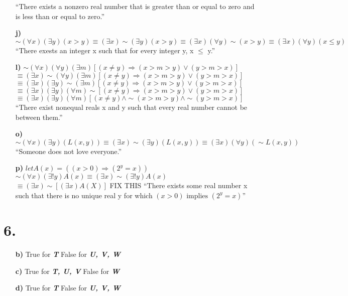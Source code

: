 \documentclass[12pt,letterpaper]{article}
\begin{document}
\begin{enumerate}[label= \textbf{\alph*)}]
						``There exists a nonzero real number that is greater than or equal to zero and is less than or equal to zero.''
	\item[\textbf{j)}] $\sim (\forall x)(\exists y)(x > y) \equiv (\exists x) \sim (\exists y)(x > y) \equiv (\exists x)(\forall y)\sim (x > y) \equiv (\exists x)(\forall y) (x \leq y)$\\
						``There exests an integer x such that for every integer y, x $\leq$ y.'' 
	\newpage
	\item[\textbf{l)}]  $\sim (\forall x)(\forall y)(\exists m)[(x \neq y) \Rightarrow (x > m > y) \lor (y > m > x)]$\\
						$\equiv (\exists x)\sim (\forall y)(\exists m)[(x \neq y) \Rightarrow (x > m > y) \lor (y > m > x)]$\\
						$\equiv (\exists x)(\exists y)\sim(\exists m)[(x \neq y) \Rightarrow (x > m > y) \lor (y > m > x)]$\\
						$\equiv (\exists x)(\exists y)(\forall m) \sim [(x \neq y) \Rightarrow (x > m > y) \lor (y > m > x)]$\\
						$\equiv (\exists x)(\exists y)(\forall m) [(x \neq y) \land \sim(x > m > y) \land \sim (y > m > x)]$\\
						``There exist nonequal reals x and y such that every real number cannot be between them.''
	\item[\textbf{o)}] $\sim (\forall x)(\exists y) (L(x,y)) \equiv (\exists x) \sim (\exists y) (L(x,y)) \equiv (\exists x)(\forall y) (\sim L(x,y))$\\
						``Someone does not love everyone.'' 
	\item[\textbf{p)}] $let A(x) = ((x > 0) \Rightarrow (2^y=x))$\\
						$\sim (\forall x)(\exists! y)A(x) \equiv (\exists x)\sim (\exists! y)A(x)$\\
						$\equiv (\exists x) \sim [(\exists x) A(X)]$
						FIX THIS
						``There exists some real number x such that there is no unique real y for which $(x > 0) \text{ implies } (2^y=x)$''
\end{enumerate}

\section*{6.}
\begin{enumerate}[label= \textbf{\alph*)}]
	\item[\textbf{b)}] True for \textbf{\textit{T}}
						False for \textbf{\textit{U, V, W}}
	\item[\textbf{c)}] True for \textbf{\textit{T, U, V}}
						False for \textbf{\textit{W}}
	\item[\textbf{d)}]  True for \textbf{\textit{T}}
						False for \textbf{\textit{U, V, W}}
\end{enumerate}
\end{document}
